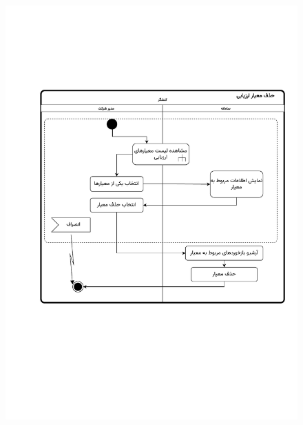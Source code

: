 \begin{figure}[ht!]
	\centering
	\includegraphics[scale=0.8, page=1]{figs/OOD-activity-deleteeval.pdf}
\end{figure}
\FloatBarrier
\newpage

